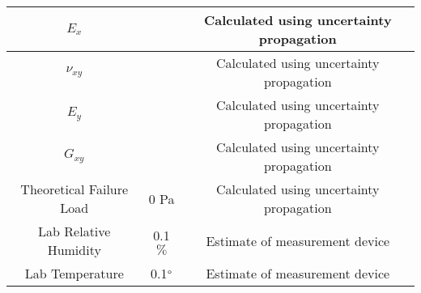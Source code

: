 \begin{table}[!h]
\begin{tabular}{|c|c|c|}
        $E_{x}$                     &  & Calculated using uncertainty propagation  \\\hline
        $\nu_{xy}$                  &  & Calculated using uncertainty propagation  \\\hline
        $E_{y}$                     &  & Calculated using uncertainty propagation  \\\hline
        $G_{xy}$                    &  & Calculated using uncertainty propagation  \\\hline
        Theoretical Failure Load    & 0 Pa & Calculated using uncertainty propagation\\\hline                        
        Lab Relative Humidity       & 0.1$\%$ & Estimate of measurement device    \\\hline
        Lab Temperature             & 0.1$\degree$ & Estimate of measurement device   \\\bottomrule
    \end{tabular}
    \label{tab:uncertainty}
\end{table}